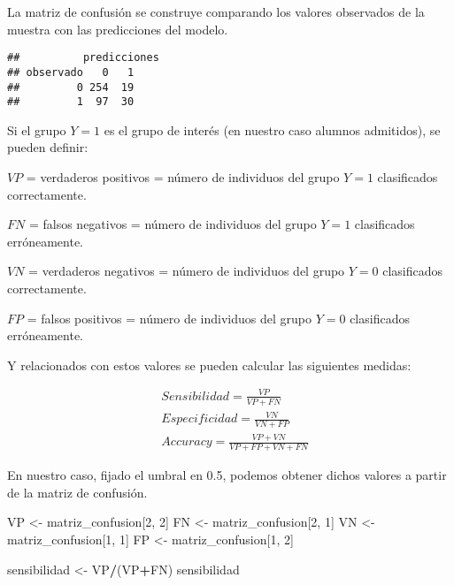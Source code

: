 \documentclass[
]{article}
\newenvironment{Shaded}{\begin{snugshade}}{\end{snugshade}}
\newcommand{\AttributeTok}[1]{\textcolor[rgb]{0.13,0.29,0.53}{#1}}
\newcommand{\DecValTok}[1]{\textcolor[rgb]{0.00,0.00,0.81}{#1}}
\newcommand{\FunctionTok}[1]{\textcolor[rgb]{0.13,0.29,0.53}{\textbf{#1}}}
\newcommand{\NormalTok}[1]{#1}
\newcommand{\OtherTok}[1]{\textcolor[rgb]{0.56,0.35,0.01}{#1}}
\newcommand{\SpecialCharTok}[1]{\textcolor[rgb]{0.81,0.36,0.00}{\textbf{#1}}}
\newcommand{\StringTok}[1]{\textcolor[rgb]{0.31,0.60,0.02}{#1}}
\begin{document}
La matriz de confusión se construye comparando los valores observados de
la muestra con las predicciones del modelo.

\begin{Shaded}
\end{Shaded}

\begin{verbatim}
##          predicciones
## observado   0   1
##         0 254  19
##         1  97  30
\end{verbatim}

Si el grupo \(Y=1\) es el grupo de interés (en nuestro caso alumnos
admitidos), se pueden definir:

\(VP\) = verdaderos positivos = número de individuos del grupo \(Y=1\)
clasificados correctamente.

\(FN\) = falsos negativos = número de individuos del grupo \(Y=1\)
clasificados erróneamente.

\(VN\) = verdaderos negativos = número de individuos del grupo \(Y=0\)
clasificados correctamente.

\(FP\) = falsos positivos = número de individuos del grupo \(Y=0\)
clasificados erróneamente.

Y relacionados con estos valores se pueden calcular las siguientes
medidas:

\begin{equation*}
\begin{split}
& Sensibilidad = \frac{VP}{VP+FN} \\
& Especificidad = \frac{VN}{VN+FP} \\
& Accuracy = \frac{VP+VN}{VP+FP+VN+FN}
\end{split}
\end{equation*}

En nuestro caso, fijado el umbral en 0.5, podemos obtener dichos valores
a partir de la matriz de confusión.

\begin{Shaded}
\begin{Highlighting}[]
\NormalTok{VP }\OtherTok{\textless{}{-}}\NormalTok{ matriz\_confusion[}\DecValTok{2}\NormalTok{, }\DecValTok{2}\NormalTok{]}
\NormalTok{FN }\OtherTok{\textless{}{-}}\NormalTok{ matriz\_confusion[}\DecValTok{2}\NormalTok{, }\DecValTok{1}\NormalTok{]}
\NormalTok{VN }\OtherTok{\textless{}{-}}\NormalTok{ matriz\_confusion[}\DecValTok{1}\NormalTok{, }\DecValTok{1}\NormalTok{]}
\NormalTok{FP }\OtherTok{\textless{}{-}}\NormalTok{ matriz\_confusion[}\DecValTok{1}\NormalTok{, }\DecValTok{2}\NormalTok{]}

\NormalTok{sensibilidad }\OtherTok{\textless{}{-}}\NormalTok{ VP}\SpecialCharTok{/}\NormalTok{(VP}\SpecialCharTok{+}\NormalTok{FN)}
\NormalTok{sensibilidad}
\end{Highlighting}
\end{Shaded}
\end{document}
